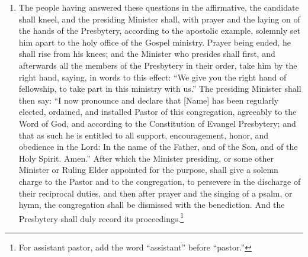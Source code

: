 \documentclass[
]{book}
\providecommand{\tightlist}{%
  \setlength{\itemsep}{0pt}\setlength{\parskip}{0pt}}
\begin{document}
\begin{enumerate}
\def\labelenumi{\arabic{enumi}.}
\setcounter{enumi}{7}
\tightlist
\item
  The people having answered these questions in the affirmative, the candidate shall kneel, and the presiding Minister shall, with prayer and the laying on of the hands of the Presbytery, according to the apostolic example, solemnly set him apart to the holy office of the Gospel ministry. Prayer being ended, he shall rise from his knees; and the Minister who presides shall first, and afterwards all the members of the Presbytery in their order, take him by the right hand, saying, in words to this effect: ``We give you the right hand of fellowship, to take part in this ministry with us.'' The presiding Minister shall then say: ``I now pronounce and declare that {[}Name{]} has been regularly elected, ordained, and installed Pastor of this congregation, agreeably to the Word of God, and according to the Constitution of Evangel Presbytery; and that as such he is entitled to all support, encouragement, honor, and obedience in the Lord: In the name of the Father, and of the Son, and of the Holy Spirit. Amen.'' After which the Minister presiding, or some other Minister or Ruling Elder appointed for the purpose, shall give a solemn charge to the Pastor and to the congregation, to persevere in the discharge of their reciprocal duties, and then after prayer and the singing of a psalm, or hymn, the congregation shall be dismissed with the benediction. And the Presbytery shall duly record its proceedings.\footnote{For assistant pastor, add the word ``assistant'' before ``pastor.''}
\end{enumerate}
\end{document}
